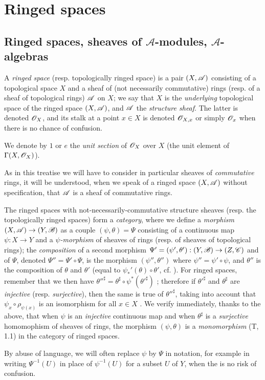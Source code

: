 \section{Ringed spaces}
\label{section:0.4}

\subsection{Ringed spaces, sheaves of $\mathcal{A}$-modules, $\mathcal{A}$-algebras}
\label{subsection:0.4.1}

\begin{env}[4.1.1]
\label{0.4.1.1}
A \emph{ringed space} (resp. topologically ringed space) is a pair $(X,\mathscr{A})$
consisting of a topological space $X$ and a sheaf of (not necessarily
commutative) rings (resp. of a sheaf of topological rings) $\mathscr{A}$ on $X$; we
say that $X$ is the \emph{underlying} topological space of the ringed space
$(X,\mathscr{A})$, and $\mathscr{A}$ the \emph{structure sheaf}. The latter is denoted
$\mathscr{O}_X$, and its stalk at a point $x\in X$ is denoted $\mathscr{O}_{X,x}$ or simply
$\mathscr{O}_x$ when there is no chance of confusion.

We denote by $1$ or $e$ the \emph{unit section} of $\mathscr{O}_X$ over $X$ (the unit
element of $\Gamma(X,\mathscr{O}_X)$).

As in this treatise we will have to consider in particular sheaves of
\emph{commutative} rings, it will be understood, when we speak of a ringed space
$(X,\mathscr{A})$ without specification, that $\mathscr{A}$ is a sheaf of commutative
rings.

The ringed spaces with not-necessarily-commutative structure sheaves
(resp. the topologically ringed spaces) form a \emph{category}, where we define
a \emph{morphism} $(X,\sh{A})\to(Y,\sh{B})$ as a couple $(\psi,\theta)=\Psi$
consisting of a continuous map $\psi:X\to Y$ and a \emph{$\psi$-morphism}
  of sheaves of rings (resp. of sheaves
of topological rings); the \emph{composition} of a second morphism
$\Psi'=(\psi',\theta'):(Y,\sh{B})\to(Z,\sh{C})$ and of $\Psi$, denoted
$\Psi''=\Psi'\circ\Psi$, is the morphism $(\psi'',\theta'')$ where
$\psi''=\psi'\circ\psi$, and $\theta''$ is the composition of $\theta$ and
$\theta'$ (equal to $\psi_*'(\theta)\circ\theta'$, cf. ). For
ringed spaces, remember that we then have
${\theta''}^\sharp=\theta^\sharp\circ\psi^*({\theta'}^\sharp)$
; therefore if ${\theta'}^\sharp$ and $\theta^\sharp$ are
\emph{injective} (resp. \emph{surjective}), then the same is true of
${\theta''}^\sharp$, taking into account that $\psi_x\circ\rho_{\psi(x)}$ is an
isomorphism for all $x\in X$ . We verify immediately, thanks to
the above, that when $\psi$ is an \emph{injective} continuous map and when
$\theta^\sharp$ is a \emph{surjective} homomophism of sheaves of rings, the
morphism $(\psi,\theta)$ is a \emph{monomorphism} (T, 1.1) in the category of
ringed spaces.

By abuse of language, we will often replace $\psi$ by $\Psi$ in notation, for
example in writing $\Psi^{-1}(U)$ in place of $\psi^{-1}(U)$ for a subset $U$ of
$Y$, when the is no risk of confusion.
\end{env}

